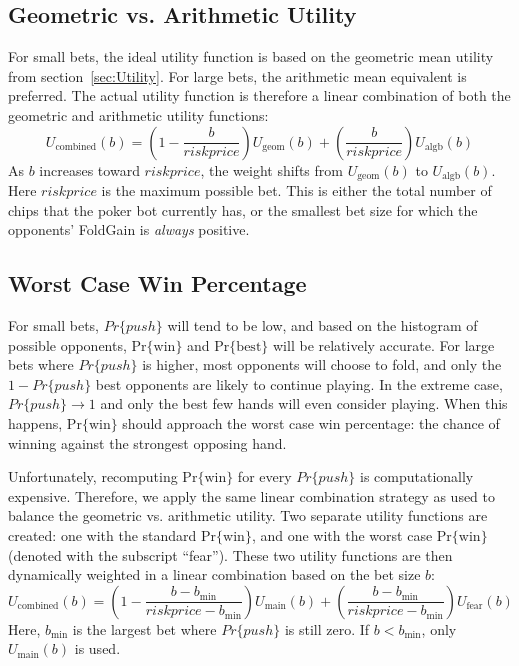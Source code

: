 \subsection{Geometric vs. Arithmetic Utility}

For small bets, the ideal utility function is based on the geometric mean utility from section~\ref{sec:Utility}.
For large bets, the arithmetic mean equivalent is preferred.
The actual utility function is therefore a linear combination of both the geometric and arithmetic utility functions:
\[
U_\mathrm{combined}(b) = \left(1 - \frac{b}{riskprice}\right) U_\mathrm{geom}(b) + \left(\frac{b}{riskprice}\right) U_\mathrm{algb}(b)
\]
As $b$ increases toward $riskprice$, the weight shifts from $U_\mathrm{geom}(b)$ to $U_\mathrm{algb}(b)$.
Here $riskprice$ is the maximum possible bet.
This is either the total number of chips that the poker bot currently has, or the smallest bet size for which the opponents' FoldGain is \emph{always} positive.

\subsection{Worst Case Win Percentage}

For small bets, $Pr\{push\}$ will tend to be low, and based on the histogram of possible opponents, $\mathrm{Pr\{win\}}$ and $\mathrm{Pr\{best\}}$ will be relatively accurate.
For large bets where $Pr\{push\}$ is higher, most opponents will choose to fold, and only the $1 - Pr\{push\}$ best opponents are likely to continue playing.
In the extreme case, $Pr\{push\} \rightarrow 1$ and only the best few hands will even consider playing.
When this happens, $\mathrm{Pr\{win\}}$ should approach the worst case win percentage: the chance of winning against the strongest opposing hand.

Unfortunately, recomputing $\mathrm{Pr\{win\}}$ for every $Pr\{push\}$ is computationally expensive.
Therefore, we apply the same linear combination strategy as used to balance the geometric vs. arithmetic utility.
Two separate utility functions are created: one with the standard $\mathrm{Pr\{win\}}$, and one with the worst case $\mathrm{Pr\{win\}}$ (denoted with the subscript ``fear'').
These two utility functions are then dynamically weighted in a linear combination based on the bet size $b$:
\[
U_\mathrm{combined}(b) = \left(1 - \frac{b - b_\mathrm{min}}{riskprice - b_\mathrm{min}}\right) U_\mathrm{main}(b) + \left(\frac{b - b_\mathrm{min}}{riskprice - b_\mathrm{min}}\right) U_\mathrm{fear}(b)
\]
Here, $b_\mathrm{min}$ is the largest bet where $Pr\{push\}$ is still zero.
If $b < b_\mathrm{min}$, only $U_\mathrm{main}(b)$ is used.

